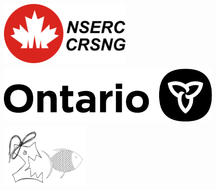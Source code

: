 \documentclass[24pt]{beamer}
\begin{document}
\begin{frame}[fragile]
\begin{textblock}{7.25}
\begin{figure}[htbp]
\centering
\includegraphics[height=3.2cm,trim={0 0 28.5cm 0},clip]{nserc-logo.jpg}
\hspace{0.5cm}
\includegraphics[height=3.2cm,trim={16.5cm 0 0 0},clip]{ontario@2x-print.png}
\hspace{0.5cm}
\includegraphics[height=3.2cm,trim={0 0.5cm 0 0.48cm},clip]{outreachlogo.png}

\end{figure}
\end{textblock}

\end{frame}
\end{document}
